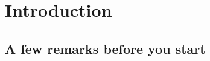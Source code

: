 \chapter{Introduction}
\label{chapter:Introduction}
\thispagestyle{myheadings}

\section{A few remarks before you start}
\label{sec:history}

